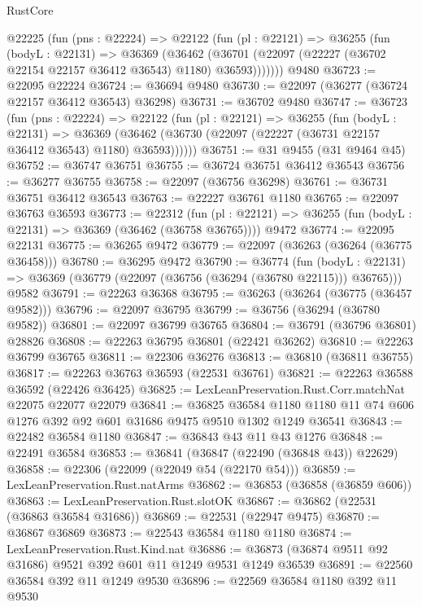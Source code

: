 \begin{lexlean}{RustCore}
\begin{coremodule}
    @22225
      (fun (pns : @22224) =>
      @22122
        (fun (pl : @22121) =>
        @36255
          (fun (bodyL : @22131) =>
          @36369
            (@36462
              (@36701 (@22097 (@22227 (@36702 @22154 @22157 @36412 @36543) @1180) @36593)))))))
    @9480
@36723 := @22095 @22224
@36724 := @36694 @9480
@36730 := @22097 (@36277 (@36724 @22157 @36412 @36543) @36298)
@36731 := @36702 @9480
@36747 := @36723
    (fun (pns : @22224) =>
    @22122
      (fun (pl : @22121) =>
      @36255
        (fun (bodyL : @22131) =>
        @36369 (@36462 (@36730 (@22097 (@22227 (@36731 @22157 @36412 @36543) @1180) @36593))))))
@36751 := @31 @9455 (@31 @9464 @45)
@36752 := @36747 @36751
@36755 := @36724 @36751 @36412 @36543
@36756 := @36277 @36755
@36758 := @22097 (@36756 @36298)
@36761 := @36731 @36751 @36412 @36543
@36763 := @22227 @36761 @1180
@36765 := @22097 @36763 @36593
@36773 := @22312
    (fun (pl : @22121) => @36255 (fun (bodyL : @22131) => @36369 (@36462 (@36758 @36765))))
    @9472
@36774 := @22095 @22131
@36775 := @36265 @9472
@36779 := @22097 (@36263 (@36264 (@36775 @36458)))
@36780 := @36295 @9472
@36790 := @36774
    (fun (bodyL : @22131) => @36369 (@36779 (@22097 (@36756 (@36294 (@36780 @22115))) @36765)))
    @9582
@36791 := @22263 @36368
@36795 := @36263 (@36264 (@36775 (@36457 @9582)))
@36796 := @22097 @36795
@36799 := @36756 (@36294 (@36780 @9582))
@36801 := @22097 @36799 @36765
@36804 := @36791 (@36796 @36801) @28826
@36808 := @22263 @36795 @36801 (@22421 @36262)
@36810 := @22263 @36799 @36765
@36811 := @22306 @36276
@36813 := @36810 (@36811 @36755)
@36817 := @22263 @36763 @36593 (@22531 @36761)
@36821 := @22263 @36588 @36592 (@22426 @36425)
@36825 := LexLeanPreservation.Rust.Corr.matchNat @22075 @22077 @22079
@36841 := @36825
    @36584
    @1180
    @1180
    @11
    @74
    @606
    @1276
    @392
    @92
    @601
    @31686
    @9475
    @9510
    @1302
    @1249
    @36541
@36843 := @22482 @36584 @1180
@36847 := @36843 @43 @11 @43 @1276
@36848 := @22491 @36584
@36853 := @36841 (@36847 (@22490 (@36848 @43)) @22629)
@36858 := @22306 (@22099 (@22049 @54 (@22170 @54)))
@36859 := LexLeanPreservation.Rust.natArms
@36862 := @36853 (@36858 (@36859 @606))
@36863 := LexLeanPreservation.Rust.slotOK
@36867 := @36862 (@22531 (@36863 @36584 @31686))
@36869 := @22531 (@22947 @9475)
@36870 := @36867 @36869
@36873 := @22543 @36584 @1180 @1180
@36874 := LexLeanPreservation.Rust.Kind.nat
@36886 := @36873 (@36874 @9511 @92 @31686) @9521 @392 @601 @11 @1249 @9531 @1249 @36539
@36891 := @22560 @36584 @392 @11 @1249 @9530
@36896 := @22569 @36584 @1180 @392 @11 @9530

\end{coremodule}
\end{lexlean}
